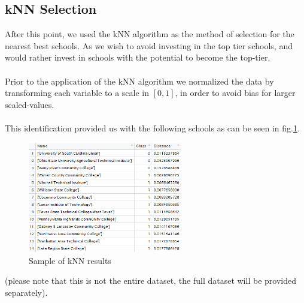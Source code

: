 \documentclass[12pt]{scrartcl}
\begin{document}
	\subsection{kNN Selection}
		After this point, we used the kNN algorithm as the method of selection for the nearest best schools. As we wish to avoid investing in the top tier schools, and would rather invest in schools with the potential to become the top-tier. 
		\\ \\
		Prior to the application of the kNN algorithm we normalized the data by transforming each variable to a scale in $[0,1]$, in order to avoid bias for larger scaled-values.\\
		\\
		This identification provided us with the following schools as can be seen in fig.\ref{fig:kNN}.
		\begin{figure}[H]
			\centering
			\includegraphics[width=0.6\textwidth]{nearest-schools.png}
			\caption{Sample of kNN results}
			\label{fig:kNN}
		\end{figure}
		(please note that this is not the entire dataset, the full dataset will be provided separately).
	
\end{document}
